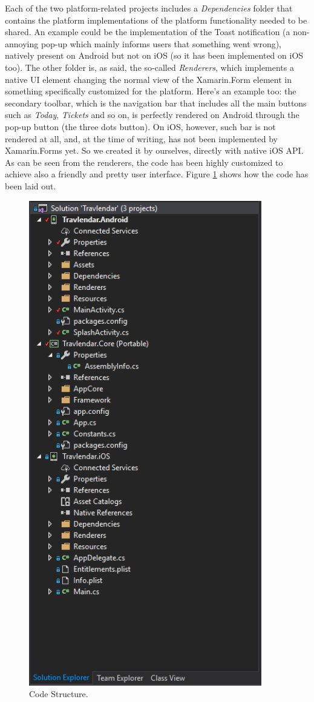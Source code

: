 Each of the two platform-related projects includes a \textit{Dependencies} folder that contains the platform implementations of the platform functionality needed to be shared. An example could be the implementation of the Toast notification (a non-annoying pop-up which mainly informs users that something went wrong), natively present on Android but not on iOS (so it has been implemented on iOS too). The other folder is, as said, the so-called \textit{Renderers}, which implements a native UI element changing the normal view of the Xamarin.Form element in something specifically customized for the platform. Here's an example too: the secondary toolbar, which is the navigation bar that includes all the main buttons such as \textit{Today}, \textit{Tickets} and so on, is perfectly rendered on Android through the pop-up button (the three dots button). On iOS, however, such bar is not rendered at all, and, at the time of writing, has not been implemented by Xamarin.Forms yet. So we created it by ourselves, directly with native iOS API. As can be seen from the renderers, the code has been highly customized to achieve also a friendly and pretty user interface. Figure \ref{fig:structure} shows how the code has been laid out.

\begin{figure}
	\centering
	\includegraphics[width=4in]{./images/code_structure.png}
	\caption{Code Structure.}
	\label{fig:structure}
\end{figure}
